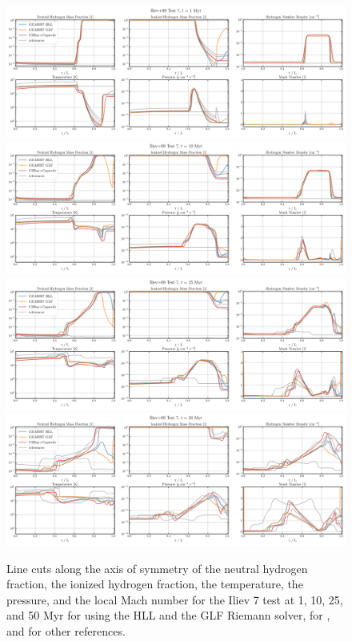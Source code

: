 \begin{figure}
\centering
\includegraphics[width=.8\textwidth]{figures/RHD/Iliev7/output_0001-Profiles.png}\\
\includegraphics[width=.8\textwidth]{figures/RHD/Iliev7/output_0010-Profiles.png}\\
\includegraphics[width=.8\textwidth]{figures/RHD/Iliev7/output_0025-Profiles.png}\\
\includegraphics[width=.8\textwidth]{figures/RHD/Iliev7/output_0050-Profiles.png}
\caption{
Line cuts along the axis of symmetry of the neutral hydrogen fraction, the ionized hydrogen
fraction, the temperature, the pressure, and the local Mach number for the Iliev 7 test at 1, 10,
25, and 50 Myr for \GEARRT using the HLL and the GLF Riemann solver, for ,
and for other references.
}
\label{fig:iliev7-profiles}
\end{figure}







